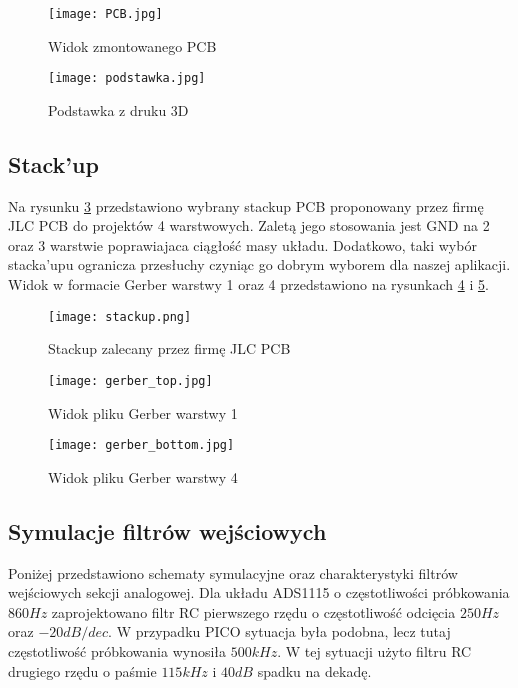 \begin{figure}[H]
        \centering
        \texttt{[image: PCB.jpg]}
        \caption{Widok zmontowanego PCB}
        \label{fig:PCB}
    \end{figure}

    \begin{figure}[H]
        \centering
        \texttt{[image: podstawka.jpg]}
        \caption{Podstawka z druku 3D}
        \label{fig:podstawka}
    \end{figure}
    
    
\subsection{Stack'up}
    Na rysunku \ref{fig:stackup} przedstawiono wybrany stackup PCB proponowany przez firmę JLC PCB do projektów 4 warstwowych.
    Zaletą jego stosowania jest GND na 2 oraz 3 warstwie poprawiajaca ciągłość masy układu.
    Dodatkowo, taki wybór stacka'upu ogranicza przesłuchy czyniąc go dobrym wyborem dla naszej aplikacji. 
    Widok w formacie Gerber warstwy 1 oraz 4 przedstawiono na rysunkach \ref{fig:gerber_top} i \ref{fig:gerber_bottom}. 
    \begin{figure}[H]
        \centering
        \texttt{[image: stackup.png]}
        \caption{Stackup zalecany przez firmę JLC PCB}
        \label{fig:stackup}
    \end{figure}

    \begin{figure}[H]
        \centering
        \texttt{[image: gerber\_top.jpg]}
        \caption{Widok pliku Gerber warstwy 1 }
        \label{fig:gerber_top}
    \end{figure}

    \begin{figure}[H]
        \centering
        \texttt{[image: gerber\_bottom.jpg]}
        \caption{Widok pliku Gerber warstwy 4 }
        \label{fig:gerber_bottom}
    \end{figure}


\subsection{Symulacje filtrów wejściowych}
Poniżej przedstawiono schematy symulacyjne oraz charakterystyki filtrów wejściowych sekcji analogowej.
Dla układu ADS1115 o częstotliwości próbkowania $860Hz$ zaprojektowano filtr RC pierwszego rzędu o częstotliwość odcięcia $250Hz$ oraz $-20dB/dec$.
W przypadku PICO sytuacja była podobna, lecz tutaj częstotliwość próbkowania wynosiła $500kHz$.
W tej sytuacji użyto filtru RC drugiego rzędu o paśmie $115kHz$ i $40dB$ spadku na dekadę.


